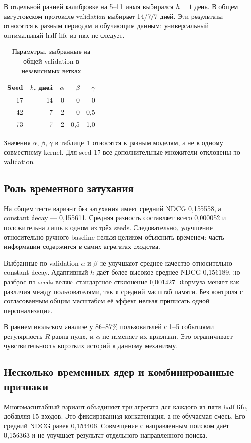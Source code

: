 \documentclass[12pt,a4paper]{article}
\begin{document}
В отдельной ранней калибровке на 5–11 июля выбирался $h=1$ день.
В общем августовском протоколе validation выбирает 14/7/7 дней.
Эти результаты относятся к разным периодам и обучающим данным:
универсальный оптимальный half-life из них не следует.
\begin{table}[H]
\centering
\small
\caption{Параметры, выбранные на общей validation в независимых ветках}\label{tab:decaychoices}
\begin{tabular}{rrrrr}\toprule
Seed & $h$, дней & $\alpha$ & $\beta$ & $\gamma$ \\ \midrule
17 & 14 & 0 & 0 & 0 \\
42 & 7 & 2 & 0 & 0,5 \\
73 & 7 & 2 & 0,5 & 1,0 \\
\bottomrule
\end{tabular}
\end{table}
Значения $\alpha$, $\beta$, $\gamma$ в таблице~\ref{tab:decaychoices}
относятся к разным моделям, а не к одному совместному kernel.
Для seed 17 все дополнительные множители отклонены по validation.

\subsection{Роль временного затухания}
На общем тесте вариант без затухания имеет средний NDCG 0,155558,
а constant decay — 0,155611. Средняя разность составляет всего
0,000052 и положительна лишь в одном из трёх seeds.
Следовательно, улучшение относительно ручного baseline нельзя целиком
объяснить временем: часть информации содержится в самих агрегатах сходства.

Выбранные по validation $\alpha$ и $\beta$ не улучшают среднее качество
относительно constant decay. Адаптивный $h$ даёт более высокое среднее
NDCG 0,156189, но разброс по seeds велик: стандартное отклонение 0,001427.
Формула меняет как различия между пользователями, так и средний масштаб
памяти. Без контроля с согласованным общим масштабом её эффект нельзя
приписать одной персонализации.

В раннем июльском анализе у 86–87\% пользователей с 1–5 событиями
регулярность $R$ равна нулю, и $\alpha$ не изменяет их признаки.
Это ограничивает чувствительность коротких историй к данному механизму.

\subsection{Несколько временных ядер и комбинированные признаки}
Многомасштабный вариант объединяет три агрегата для каждого из пяти
half-life, добавляя 15 входов. Это фиксированная конкатенация,
а не обучаемая смесь. Его средний NDCG равен 0,156406.
Совмещение с направленным поиском даёт 0,156363 и не улучшает
результат отдельного направленного поиска.
\end{document}
